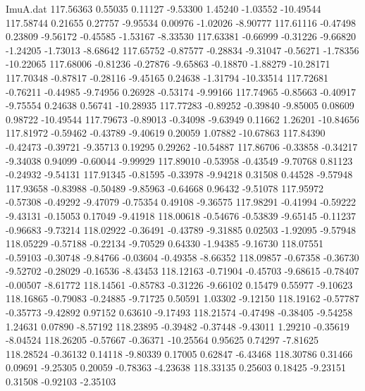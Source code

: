 \begin{filecontents}{ImuA.dat}
 117.56363    0.55035    0.11127   -9.53300    1.45240   -1.03552  -10.49544
 117.58744    0.21655    0.27757   -9.95534    0.00976   -1.02026   -8.90777
 117.61116   -0.47498    0.23809   -9.56172   -0.45585   -1.53167   -8.33530
 117.63381   -0.66999   -0.31226   -9.66820   -1.24205   -1.73013   -8.68642
 117.65752   -0.87577   -0.28834   -9.31047   -0.56271   -1.78356  -10.22065
 117.68006   -0.81236   -0.27876   -9.65863   -0.18870   -1.88279  -10.28171
 117.70348   -0.87817   -0.28116   -9.45165    0.24638   -1.31794  -10.33514
 117.72681   -0.76211   -0.44985   -9.74956    0.26928   -0.53174   -9.99166
 117.74965   -0.85663   -0.40917   -9.75554    0.24638    0.56741  -10.28935
 117.77283   -0.89252   -0.39840   -9.85005    0.08609    0.98722  -10.49544
 117.79673   -0.89013   -0.34098   -9.63949    0.11662    1.26201  -10.84656
 117.81972   -0.59462   -0.43789   -9.40619    0.20059    1.07882  -10.67863
 117.84390   -0.42473   -0.39721   -9.35713    0.19295    0.29262  -10.54887
 117.86706   -0.33858   -0.34217   -9.34038    0.94099   -0.60044   -9.99929
 117.89010   -0.53958   -0.43549   -9.70768    0.81123   -0.24932   -9.54131
 117.91345   -0.81595   -0.33978   -9.94218    0.31508    0.44528   -9.57948
 117.93658   -0.83988   -0.50489   -9.85963   -0.64668    0.96432   -9.51078
 117.95972   -0.57308   -0.49292   -9.47079   -0.75354    0.49108   -9.36575
 117.98291   -0.41994   -0.59222   -9.43131   -0.15053    0.17049   -9.41918
 118.00618   -0.54676   -0.53839   -9.65145   -0.11237   -0.96683   -9.73214
 118.02922   -0.36491   -0.43789   -9.31885    0.02503   -1.92095   -9.57948
 118.05229   -0.57188   -0.22134   -9.70529    0.64330   -1.94385   -9.16730
 118.07551   -0.59103   -0.30748   -9.84766   -0.03604   -0.49358   -8.66352
 118.09857   -0.67358   -0.36730   -9.52702   -0.28029   -0.16536   -8.43453
 118.12163   -0.71904   -0.45703   -9.68615   -0.78407   -0.00507   -8.61772
 118.14561   -0.85783   -0.31226   -9.66102    0.15479    0.55977   -9.10623
 118.16865   -0.79083   -0.24885   -9.71725    0.50591    1.03302   -9.12150
 118.19162   -0.57787   -0.35773   -9.42892    0.97152    0.63610   -9.17493
 118.21574   -0.47498   -0.38405   -9.54258    1.24631    0.07890   -8.57192
 118.23895   -0.39482   -0.37448   -9.43011    1.29210   -0.35619   -8.04524
 118.26205   -0.57667   -0.36371  -10.25564    0.95625    0.74297   -7.81625
 118.28524   -0.36132    0.14118   -9.80339    0.17005    0.62847   -6.43468
 118.30786    0.31466    0.09691   -9.25305    0.20059   -0.78363   -4.23638
 118.33135    0.25603    0.18425   -9.23151    0.31508   -0.92103   -2.35103

\end{filecontents}

